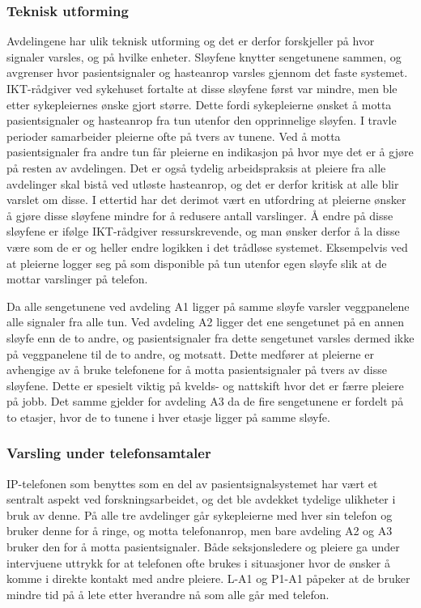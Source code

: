 \subsubsection{Teknisk utforming}
Avdelingene har ulik teknisk utforming og det er derfor forskjeller på hvor signaler varsles, og på hvilke enheter. Sløyfene knytter sengetunene sammen, og avgrenser hvor pasientsignaler og hasteanrop varsles gjennom det faste systemet. IKT-rådgiver ved sykehuset fortalte at disse sløyfene først var mindre, men ble etter sykepleiernes ønske gjort større. Dette fordi sykepleierne ønsket å motta pasientsignaler og hasteanrop fra tun utenfor den opprinnelige sløyfen. I travle perioder samarbeider pleierne ofte på tvers av tunene. Ved å motta pasientsignaler fra andre tun får pleierne en indikasjon på hvor mye det er å gjøre på resten av avdelingen. Det er også tydelig arbeidspraksis at pleiere fra alle avdelinger skal bistå ved utløste hasteanrop, og det er derfor kritisk at alle blir varslet om disse. I ettertid har det derimot vært en utfordring at pleierne ønsker å gjøre disse sløyfene mindre for å redusere antall varslinger. Å endre på disse sløyfene er ifølge IKT-rådgiver ressurskrevende, og man ønsker derfor å la disse være som de er og heller endre logikken i det trådløse systemet. Eksempelvis ved at pleierne logger seg på som disponible på tun utenfor egen sløyfe slik at de mottar varslinger på telefon.

\noindent
Da alle sengetunene ved avdeling A1 ligger på samme sløyfe varsler veggpanelene alle signaler fra alle tun. Ved avdeling A2 ligger det ene sengetunet på en annen sløyfe enn de to andre, og pasientsignaler fra dette sengetunet varsles dermed ikke på veggpanelene til de to andre, og motsatt. Dette medfører at pleierne er avhengige av å bruke telefonene for å motta pasientsignaler på tvers av disse sløyfene. Dette er spesielt viktig på kvelds- og nattskift hvor det er færre pleiere på jobb. Det samme gjelder for avdeling A3 da de fire sengetunene er fordelt på to etasjer, hvor de to tunene i hver etasje ligger på samme sløyfe.

\subsubsection{Varsling under telefonsamtaler}
IP-telefonen som benyttes som en del av pasientsignalsystemet har vært et sentralt aspekt ved forskningsarbeidet, og det ble avdekket tydelige ulikheter i bruk av denne. På alle tre avdelinger går sykepleierne med hver sin telefon og bruker denne for å ringe, og motta telefonanrop, men bare avdeling A2 og A3 bruker den for å motta pasientsignaler. Både seksjonsledere og pleiere ga under intervjuene uttrykk for at telefonen ofte brukes i situasjoner hvor de ønsker å komme i direkte kontakt med andre pleiere. L-A1 og P1-A1 påpeker at de bruker mindre tid på å lete etter hverandre nå som alle går med telefon.   


